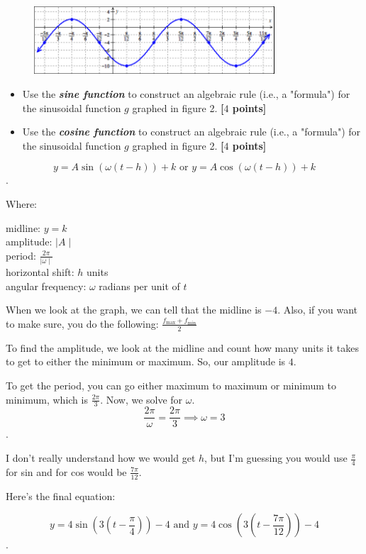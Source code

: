 \newpage

\begin{problem}
  \begin{figure}[H]
    \centering
    \includegraphics[width=0.8\textwidth]{images/week-3b.png}
    \caption{}
    \label{fig:week_3b}
  \end{figure}

  \begin{itemize}
    \item Use the \textbf{\textit{sine function}} to construct an algebraic rule
      (i.e., a "formula") for the sinusoidal function $g$ graphed in figure 2.
      \textbf{[$4$ points]}
    \item Use the \textbf{\textit{cosine function}} to construct an algebraic
      rule (i.e., a "formula") for the sinusoidal function $g$ graphed in figure
      2. \textbf{[$4$ points]}
  \end{itemize}
\end{problem}

\begin{solution}
  \[
  y = A\sin(\omega(t - h)) + k \textrm{ or } y = A\cos(\omega(t - h)) + k
  \].

  Where:
  \begin{center}
    midline: $y = k$ \\
    amplitude:  $\mid A \mid$ \\
    period: $\frac{2\pi}{\mid \omega \mid}$ \\
    horizontal shift: $h$ units \\
    angular frequency: $\omega$ radians per unit of $t$
  \end{center}

  When we look at the graph, we can tell that the midline is $-4$. Also, if
  you want to make sure, you do the following:
  $\frac{f_{\textrm{max}} + f_{\textrm{min}}}{2}$

  To find the amplitude, we look at the midline and count how many units it
  takes to get to either the minimum or maximum. So, our amplitude is $4$.

  To get the period, you can go either maximum to maximum or minimum to
  minimum, which is $\frac{2\pi}{3}$. Now, we solve for $\omega$.
  \[
  \frac{2\pi}{\omega} = \frac{2\pi}{3} \implies \omega = 3
  \].

  I don't really understand how we would get $h$, but I'm guessing you would
  use $\frac{\pi}{4}$ for sin and for cos would be $\frac{7\pi}{12}$.

  Here's the final equation:

  \[
  y = 4\sin \left(3 \left(t - \frac{\pi}{4}\right)\right) - 4 \textrm{ and }
  y = 4\cos \left(3 \left(t - \frac{7\pi}{12}\right)\right) - 4
  \].
\end{solution}

